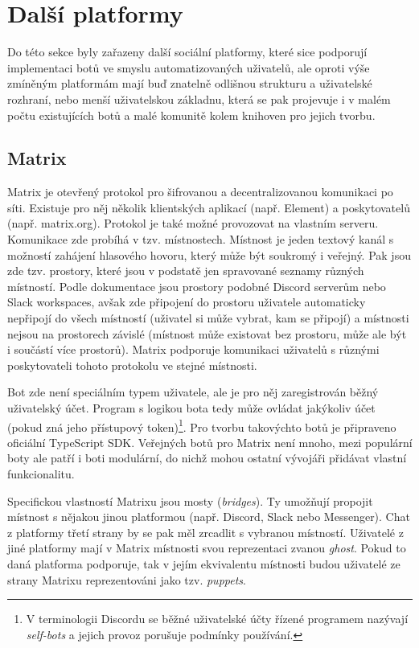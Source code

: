 \documentclass[FM]{tulthesis}
\begin{document}
	\section{Další platformy}
	
	Do této sekce byly zařazeny další sociální platformy, které sice podporují implementaci botů ve smyslu automatizovaných uživatelů, ale oproti výše zmíněným platformám mají buď znatelně odlišnou strukturu a uživatelské rozhraní, nebo menší uživatelskou základnu, která se pak projevuje i v malém počtu existujících botů a malé komunitě kolem knihoven pro jejich tvorbu.
	
	\subsection{Matrix}
	
	Matrix je otevřený protokol pro šifrovanou a decentralizovanou komunikaci po síti. Existuje pro něj několik klientských aplikací (např. Element) a poskytovatelů (např. matrix.org). Protokol je také možné provozovat na vlastním serveru. Komunikace zde probíhá v tzv. místnostech. Místnost je jeden textový kanál s možností zahájení hlasového hovoru, který může být soukromý i veřejný. Pak jsou zde tzv. prostory, které jsou v podstatě jen spravované seznamy různých místností. Podle dokumentace jsou prostory podobné Discord serverům nebo Slack workspaces, avšak zde připojení do prostoru uživatele automaticky nepřipojí do všech místností (uživatel si může vybrat, kam se připojí) a místnosti nejsou na prostorech závislé (místnost může existovat bez prostoru, může ale být i součástí více prostorů). Matrix podporuje komunikaci uživatelů s různými poskytovateli tohoto protokolu ve stejné místnosti.
	
	Bot zde není speciálním typem uživatele, ale je pro něj zaregistrován běžný uživatelský účet. Program s logikou bota tedy může ovládat jakýkoliv účet (pokud zná jeho přístupový token)\footnote{V terminologii Discordu se běžné uživatelské účty řízené programem nazývají \textit{self-bots} a jejich provoz porušuje podmínky používání.}. Pro tvorbu takovýchto botů je připraveno oficiální \mbox{TypeScript} SDK. Veřejných botů pro Matrix není mnoho, mezi populární boty ale patří i boti modulární, do nichž mohou ostatní vývojáři přidávat vlastní funkcionalitu.
	
	Specifickou vlastností Matrixu jsou mosty (\textit{bridges}). Ty umožňují propojit místnost s nějakou jinou platformou (např. Discord, Slack nebo Messenger). Chat z platformy třetí strany by se pak měl zrcadlit s vybranou místností. Uživatelé z jiné platformy mají v Matrix místnosti svou reprezentaci zvanou \textit{ghost}. Pokud to daná platforma podporuje, tak v jejím ekvivalentu místnosti budou uživatelé ze strany Matrixu reprezentováni jako tzv. \textit{puppets}. \cite{doc_Matrix}
	
\end{document}
